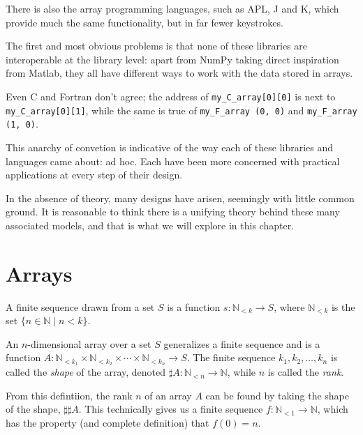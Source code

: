 \documentclass{DIKU-report}
\newcommand\Nat{\mathbb{N}}
\begin{document}
There is also the array programming languages, such as APL, J and K, which provide
much the same functionality, but in far fewer keystrokes.

The first and most obvious problems is that none of these libraries are interoperable
at the library level: apart from NumPy taking direct inspiration from Matlab, they
all have different ways to work with the data stored in arrays.

Even C and Fortran don't agree; the address of \texttt{my\_C\_array[0][0]} is next
to \texttt{my\_C\_array[0][1]}, while the same is true of \texttt{my\_F\_array (0, 0)}
and \texttt{my\_F\_array (1, 0)}.

This anarchy of convetion is indicative of the way each of these libraries and
languages came about: ad hoc. Each have been more concerned with practical applications
at every step of their design.

In the absence of theory, many designs have arisen, seemingly with little common
ground. It is reasonable to think there is a unifying theory behind these many associated
models, and that is what we will explore in this chapter.

\section{Arrays}

\begin{definition}
  \label{def:finseq}
  A finite sequence drawn from a set \(S\) is a function \(s : \Nat_{<k} \to S\),
  where \(\Nat_{<k}\) is the set \(\{ n \in \Nat \mid n < k \}\).
\end{definition}

\begin{definition}
  \label{def:array}
  An \(n\)-dimensional array over a set \(S\) generalizes a finite sequence and
  is a function \(A : \Nat_{<k_1} \times \Nat_{<k_2} \times \cdots \times \Nat_{<k_n} \to S\).
  The finite sequence \(k_1, k_2, \dots, k_n\) is called the \emph{shape} of the array, denoted
  \(\sharp A : \Nat_{<n} \to \Nat\), while \(n\) is called the \emph{rank}.
\end{definition}

\begin{observation}
  \label{ob:rank}
  From this defintiion, the rank \(n\) of an array \(A\) can be found by taking the
  shape of the shape, \(\sharp\sharp A\). This technically gives us a finite sequence
  \(f : \Nat_{<1} \to \Nat\), which has the property (and complete definition) that \(f(0) = n\).
\end{observation}
\end{document}

